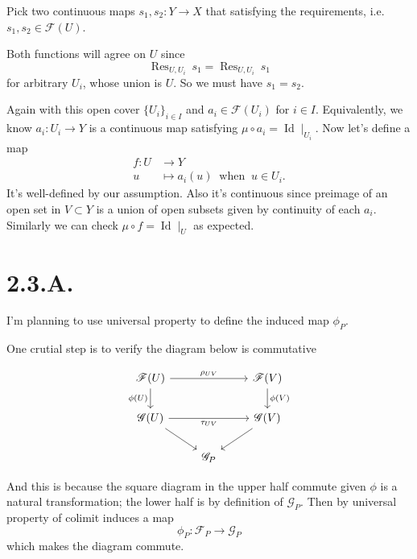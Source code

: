 Pick two continuous maps $s_1,s_2:Y\to X$ that satisfying the requirements, i.e. $s_1,s_2\in\mathscr F(U)$.

Both functions will agree on $U$ since 
\[\operatorname{Res}_{U,U_i}~ s_1=\operatorname{Res}_{U,U_i}~ s_1\] for arbitrary $U_i$, whose union is $U$. So we must have $s_1=s_2$.

Again with this open cover $\{U_i\}_{i\in I}$ and $a_i\in \mathscr F(U_i)$ for $i\in I$. Equivalently, we know $a_i:U_i\to Y$ is a continuous map satisfying $\mu\circ a_i=\operatorname{Id}\mid_{U_i}$.
Now let's define a map 
\begin{align*}
    f:U &\to Y\\
    u &\mapsto a_i(u) ~\text{ when }~ u\in U_i.     
\end{align*}It's well-defined by our assumption. Also it's continuous since preimage of an open set in $V\subset Y$ is a union of open subsets given by continuity of each $a_i$. Similarly we can check $\mu\circ f=\operatorname{Id}\mid_{U}$ as expected.

\section{2.3.A.}

I'm planning to use universal property to define the induced map $\phi_P$.

One crutial step is to verify the diagram below is commutative

\[\begin{tikzcd}
	{\mathscr F(U)} && {\mathscr F(V)} \\
	{\mathscr G(U)} && {\mathscr G(V)} \\
	& {\mathscr G_P}
	\arrow["{\phi(U)}"', from=1-1, to=2-1]
	\arrow["{\rho_{UV}}", from=1-1, to=1-3]
	\arrow["{\tau_{UV}}"', from=2-1, to=2-3]
	\arrow["{\phi(V)}", from=1-3, to=2-3]
	\arrow[from=2-1, to=3-2]
	\arrow[from=2-3, to=3-2]
\end{tikzcd}\]

And this is because the square diagram in the upper half commute given $\phi$ is a natural transformation; the lower half is by definition of $\mathscr G_P$. Then by universal property of colimit induces a map
\[\phi_P:\mathscr F_P\to\mathscr G_P\] which makes the diagram commute.

